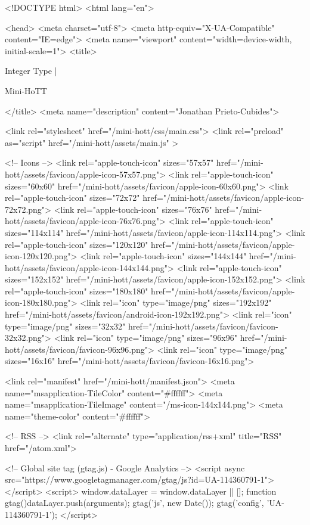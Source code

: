 <!DOCTYPE html>
<html lang="en">

<head>
  <meta charset="utf-8">
  <meta http-equiv="X-UA-Compatible" content="IE=edge">
  <meta name="viewport" content="width=device-width, initial-scale=1">
  <title>
    
      
        Integer Type |
      
        Mini-HoTT
    
  </title>
  <meta name="description" content="Jonathan Prieto-Cubides">

  <link rel="stylesheet" href="/mini-hott/css/main.css">
  <link rel="preload" as="script" href="/mini-hott/assets/main.js" >

  <!-- Icons -->
  <link rel="apple-touch-icon" sizes="57x57" href="/mini-hott/assets/favicon/apple-icon-57x57.png">
  <link rel="apple-touch-icon" sizes="60x60" href="/mini-hott/assets/favicon/apple-icon-60x60.png">
  <link rel="apple-touch-icon" sizes="72x72" href="/mini-hott/assets/favicon/apple-icon-72x72.png">
  <link rel="apple-touch-icon" sizes="76x76" href="/mini-hott/assets/favicon/apple-icon-76x76.png">
  <link rel="apple-touch-icon" sizes="114x114" href="/mini-hott/assets/favicon/apple-icon-114x114.png">
  <link rel="apple-touch-icon" sizes="120x120" href="/mini-hott/assets/favicon/apple-icon-120x120.png">
  <link rel="apple-touch-icon" sizes="144x144" href="/mini-hott/assets/favicon/apple-icon-144x144.png">
  <link rel="apple-touch-icon" sizes="152x152" href="/mini-hott/assets/favicon/apple-icon-152x152.png">
  <link rel="apple-touch-icon" sizes="180x180" href="/mini-hott/assets/favicon/apple-icon-180x180.png">
  <link rel="icon" type="image/png" sizes="192x192"  href="/mini-hott/assets/favicon/android-icon-192x192.png">
  <link rel="icon" type="image/png" sizes="32x32" href="/mini-hott/assets/favicon/favicon-32x32.png">
  <link rel="icon" type="image/png" sizes="96x96" href="/mini-hott/assets/favicon/favicon-96x96.png">
  <link rel="icon" type="image/png" sizes="16x16" href="/mini-hott/assets/favicon/favicon-16x16.png">

  <link rel="manifest" href="/mini-hott/manifest.json">
  <meta name="msapplication-TileColor" content="#ffffff">
  <meta name="msapplication-TileImage" content="/ms-icon-144x144.png">
  <meta name="theme-color" content="#ffffff">

  <!-- RSS -->
  <link rel="alternate" type="application/rss+xml" title="RSS" href="/atom.xml">

  <!-- Global site tag (gtag.js) - Google Analytics -->
  <script async src="https://www.googletagmanager.com/gtag/js?id=UA-114360791-1"></script>
  <script>
    window.dataLayer = window.dataLayer || [];
    function gtag(){dataLayer.push(arguments);}
    gtag('js', new Date());
    gtag('config', 'UA-114360791-1');
  </script>

